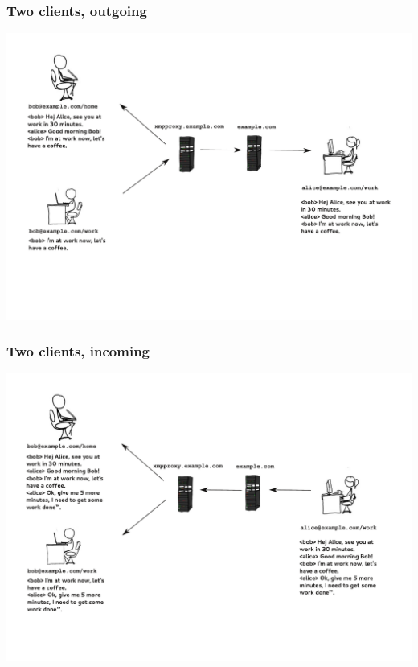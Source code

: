 \documentclass[notes=hide,yellow]{beamer}
\begin{document}
	\begin{frame}
		\frametitle{Two clients, outgoing}
		\includegraphics[scale=0.4]{../img/proxy2.pdf}
	\end{frame}
	
	\begin{frame}
		\frametitle{Two clients, incoming}
		\includegraphics[scale=0.4]{../img/proxy3.pdf}
	\end{frame}
\end{document}
